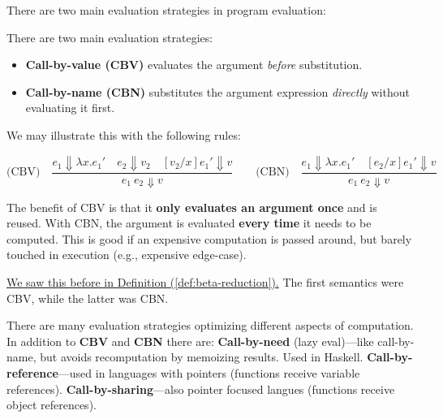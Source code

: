 \noindent
There are two main evaluation strategies in program evaluation:
\begin{Def}

    There are two main evaluation strategies:
    
    \begin{itemize}
        \item \textbf{Call-by-value (CBV)} evaluates the argument \emph{before} substitution.
        \item \textbf{Call-by-name (CBN)} substitutes the argument expression \emph{directly} without evaluating it first.
    \end{itemize}
    
    \noindent 
    We may illustrate this with the following rules:
    
    \[
    \text{(CBV)} \quad
    \frac{
    e_1 \Downarrow \lambda x. e_1'
    \quad
    e_2 \Downarrow v_2
    \quad
    [v_2/x]e_1' \Downarrow v
    }{
    e_1\ e_2 \Downarrow v
    }
    \quad\quad
    \text{(CBN)} \quad
    \frac{
    e_1 \Downarrow \lambda x. e_1'
    \quad
    [e_2/x]e_1' \Downarrow v
    }{
    e_1\ e_2 \Downarrow v
    }
    \]
    
    \noindent
    The benefit of CBV is that it \textbf{only evaluates an argument once} and is reused. With 
    CBN, the argument is evaluated \textbf{every time} it needs to be computed. This is good if 
    an expensive computation is passed around, but barely touched in execution (e.g., expensive edge-case).
    \end{Def}

    \noindent 
    \underline{We saw this before in Definition (\ref{def:beta-reduction}).} The first semantics were CBV, while the latter was CBN.
    
    \begin{Tip} There are many evaluation strategies optimizing different aspects of computation. In addition to \textbf{CBV} and \textbf{CBN} there are:
    \textbf{Call-by-need} (lazy eval)---like call-by-name, but avoids recomputation by memoizing results. Used in Haskell.
    \textbf{Call-by-reference}---used in languages with pointers (functions receive variable references).
    \textbf{Call-by-sharing}---also pointer focused langues (functions receive object references).

\end{Tip}
        
\newpage 

